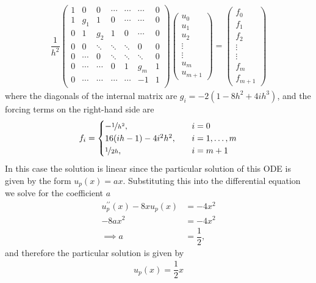 \documentclass[12pt]{article}
\begin{document}
\begin{align}
    \dfrac{1}{h^{2}}\begin{pmatrix}
        1 & 0 & 0 & \cdots & \cdots & \cdots & 0\\
        1 & g_{1} & 1 & 0 & \cdots & \cdots &0 \\
        0 & 1 & g_{2} & 1 & 0 & \cdots & 0 \\
        0 & 0 & \ddots & \ddots & \ddots & 0 & 0 \\
        0 & \cdots & 0 & \ddots & \ddots & \ddots & 0  \\
        0 & \cdots & \cdots & 0 & 1 & g_{m} & 1\\
        0 & \cdots & \cdots & \cdots & \cdots & -1 & 1\\
    \end{pmatrix}
    \begin{pmatrix}
        u_{0} \\ u_{1} \\ u_{2} \\ \vdots \\ \vdots \\ u_{m} \\ u_{m+1}
    \end{pmatrix}
    =
    \begin{pmatrix}
        f_{0} \\ f_{1} \\ f_{2} \\ \vdots \\ \vdots \\ f_{m} \\ f_{m+1}
    \end{pmatrix}
\end{align}
where the diagonals of the internal matrix are $g_{i} = -2(1-8h^{2}+4ih^{3})$, and the forcing terms on the right-hand side are
\begin{align}
    f_{i} =
    \begin{cases}
        -\nicefrac{1}{h^{2}},&\quad i = 0\\
        16(ih-1)-4i^{2}h^{2},&\quad i=1,\dots,m\\
        \nicefrac{1}{2h},&\quad i = m+1
    \end{cases}
\end{align}
In this case the solution is linear since the particular solution of this ODE is given by the form $u_{p}(x) = ax$.
Substituting this into the differential equation we solve for the coefficient $a$
\begin{subequations}
    \begin{align}
        u_{p}^{\prime\prime}(x) - 8xu_{p}(x) &= -4x^{2}\\
        -8ax^{2} &= -4x^{2} \\
        \implies a &= \dfrac{1}{2},
    \end{align}
\end{subequations}
and therefore the particular solution is given by
\begin{align}
    u_{p}(x) = \dfrac{1}{2}x
\end{align}
\end{document}
